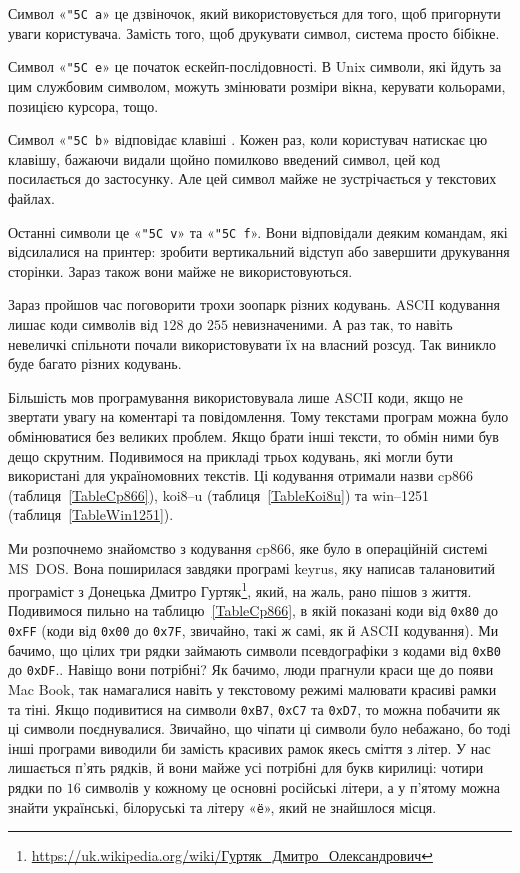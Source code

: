 \documentclass{book}
\newcommand{\hexstr}[1]{{\tt 0x#1}}
\newcommand{\escape}[1]{\texttt{\char"5C #1}}
\newcommand{\chr}[1]{«\texttt{#1}»}
\newcommand{\chesc}[1]{\chr{\escape{#1}}}
\newcommand{\Gurtyak}{\href{https://uk.wikipedia.org/wiki/\%D0\%93\%D1\%83\%D1\%80\%D1\%82\%D1\%8F\%D0\%BA_\%D0\%94\%D0\%BC\%D0\%B8\%D1\%82\%D1\%80\%D0\%BE_\%D0\%9E\%D0\%BB\%D0\%B5\%D0\%BA\%D1\%81\%D0\%B0\%D0\%BD\%D0\%B4\%D1\%80\%D0\%BE\%D0\%B2\%D0\%B8\%D1\%87}{https://uk.wikipedia.org/wiki/Гуртяк\_Дмитро\_Олександрович}}
\begin{document}
Символ \chesc a це дзвіночок, який використовується для того, щоб пригорнути уваги користувача.
Замість того, щоб друкувати символ, система просто бібікне.

Символ \chesc e це початок ескейп-послідовності.
В Unix символи, які йдуть за цим службовим символом, можуть змінювати розміри вікна, керувати кольорами, позицією курсора, тощо.

Символ \chesc b відповідає клавіші \keys{\backspace}.
Кожен раз, коли користувач натискає цю клавішу, бажаючи видали щойно помилково введений символ, цей код посилається до застосунку.
Але цей символ майже не зустрічається у текстових файлах.

Останні символи це \chesc v та \chesc f.
Вони відповідали деяким командам, які відсилалися на принтер: зробити вертикальний відступ або завершити друкування сторінки.
Зараз також вони майже не використовуються.

\medskip

Зараз пройшов час поговорити трохи зоопарк різних кодувань.
ASCII кодування лишає коди символів від $128$ до $255$ невизначеними.
А раз так, то навіть невеличкі спільноти почали використовувати їх на власний розсуд.
Так виникло буде багато різних кодувань.

Більшість мов програмування використовувала лише ASCII коди, якщо не звертати увагу на коментарі та повідомлення.
Тому текстами програм можна було обмінюватися без великих проблем.
Якщо брати інші тексти, то обмін ними був дещо скрутним.
Подивимося на прикладі трьох кодувань,  які могли бути використані для україномовних текстів.
Ці кодування отримали назви cp866 (таблиця~\ref{TableCp866}), koi8--u (таблиця~\ref{TableKoi8u}) та win--1251 (таблиця~\ref{TableWin1251}).

Ми розпочнемо знайомство з кодування cp866, яке було в операційній системі MS~DOS.
Вона поширилася завдяки програмі keyrus, яку написав талановитий програміст з Донецька Дмитро Гуртяк\footnote{\Gurtyak}, який, на жаль, рано пішов з життя.
Подивимося пильно на таблицю~\ref{TableCp866}, в якій показані коди від \hexstr{80} до \hexstr{FF} (коди від \hexstr{00} до \hexstr{7F}, звичайно, такі ж самі, як й ASCII кодування).
Ми бачимо, що цілих три рядки займають символи псевдографіки з кодами від \hexstr{B0} до \hexstr{DF}..
Навіщо вони потрібні?
Як бачимо, люди прагнули краси ще до появи Mac Book, так намагалися навіть у текстовому режимі малювати красиві рамки та тіні.
Якщо подивитися на символи \hexstr{B7}, \hexstr{C7} та \hexstr{D7}, то можна побачити як ці символи поєднувалися.
Звичайно, що чіпати ці символи було небажано, бо тоді інші програми виводили би замість красивих рамок якесь сміття з літер.
У нас лишається п'ять рядків, й вони майже усі потрібні для букв кирилиці: чотири рядки по $16$ символів у кожному це основні російські літери, а у п'ятому можна знайти українські, білоруські та літеру \chr{ё}, який не знайшлося місця.
\end{document}

